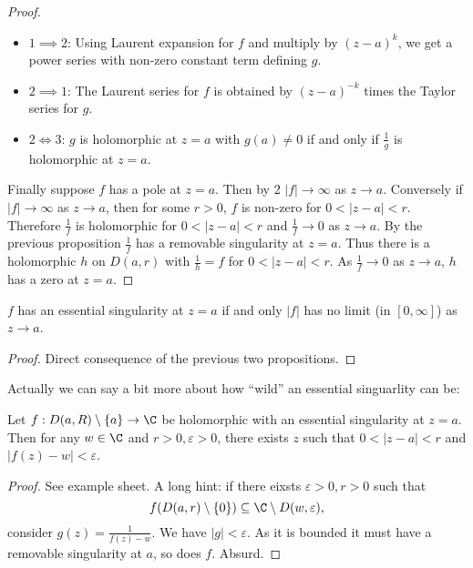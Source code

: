 \documentclass[a4paper]{article}
\begin{document}
\begin{proof}\leavevmode
  \begin{itemize}
  \item \(1 \implies 2\): Using Laurent expansion for \(f\) and multiply by \((z - a)^k\), we get a power series with non-zero constant term defining \(g\).
  \item \(2 \implies 1\): The Laurent series for \(f\) is obtained by \((z - a)^{-k}\) times the Taylor series for \(g\).
  \item \(2 \Longleftrightarrow 3\): \(g\) is holomorphic at \(z = a\) with \(g(a) \neq 0\) if and only if \(\frac{1}{g}\) is holomorphic at \(z = a\).
  \end{itemize}

  Finally suppose \(f\) has a pole at \(z = a\). Then by 2 \(|f| \to \infty\) as \(z \to a\). Conversely if \(|f| \to \infty\) as \(z \to a\), then for some \(r > 0\), \(f\) is non-zero for \(0 < |z - a| < r\). Therefore \(\frac{1}{f}\) is holomorphic for \(0 < |z - a| < r\) and \(\frac{1}{f} \to 0\) as \(z \to a\). By the previous proposition \(\frac{1}{f}\) has a removable singularity at \(z = a\). Thus there is a holomorphic \(h\) on \(D(a, r)\) with \(\frac{1}{h} = f\) for \(0 < |z - a| < r\). As \(\frac{1}{f} \to 0\) as \(z \to a\), \(h\) has a zero at \(z = a\).
\end{proof}

\begin{corollary}
  \(f\) has an essential singularity at \(z = a\) if and only \(|f|\) has no limit (in \([0, \infty]\)) as \(z \to a\).
\end{corollary}

\begin{proof}
  Direct consequence of the previous two propositions.
\end{proof}

Actually we can say a bit more about how ``wild'' an essential singuarlity can be:

\begin{theorem}
  Let \(f: D(a, R) \setminus \{a\} \to \C\) be holomorphic with an essential singularity at \(z = a\). Then for any \(w \in \C\) and \(r > 0, \varepsilon > 0\), there exists \(z\) such that \(0 < |z - a| < r\) and \(|f(z) - w| < \varepsilon\).
\end{theorem}

\begin{proof}
  See example sheet. A long hint: if there eixsts \(\varepsilon > 0, r > 0\) such that
  \[
    f(D(a, r) \setminus \{0\}) \subseteq \C \setminus D(w, \varepsilon),
  \]
  consider \(g(z) = \frac{1}{f(z) - w}\). We have \(|g| < \varepsilon\). As it is bounded it must have a removable singularity at \(a\), so does \(f\). Absurd.
\end{proof}
\end{document}
